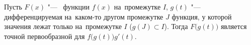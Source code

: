 
  Пусть $F(x)$ "--- \tp\ функции $f(x)$ на~промежутке $I$, $g(t)$ "--- дифференцируемая на~каком-то другом промежутке $J$ функция, у которой значения лежат только на~промежутке $I$ ($g(J)\subset I$).
  Тогда $F\big( g(t)\big)$ является точной первообразной для $f\big(g(t)\big)g'(t)$.
